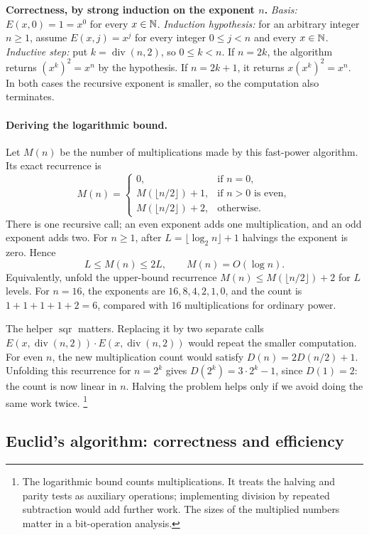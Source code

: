 \textbf{Correctness, by strong induction on the exponent $n$.}
\emph{Basis:} $E(x,0)=1=x^0$ for every $x\in\mathbb{N}$.
\emph{Induction hypothesis:} for an arbitrary integer $n\geq1$, assume
$E(x,j)=x^j$ for every integer $0\leq j<n$ and every $x\in\mathbb{N}$.
\emph{Inductive step:} put $k=\operatorname{div}(n,2)$, so $0\leq k<n$.
If $n=2k$, the algorithm returns $(x^k)^2=x^n$ by the hypothesis.
If $n=2k+1$, it returns $x(x^k)^2=x^n$. In both cases the recursive
exponent is smaller, so the computation also terminates.

\paragraph{Deriving the logarithmic bound.}
Let $M(n)$ be the number of multiplications made by this fast-power algorithm.
Its exact recurrence is
\[
M(n)=\begin{cases}
0,&\text{if }n=0,\\
M(\lfloor n/2\rfloor)+1,&\text{if }n>0\text{ is even},\\
M(\lfloor n/2\rfloor)+2,&\text{otherwise}.
\end{cases}
\]
There is one recursive call; an even exponent adds one multiplication,
and an odd exponent adds two. For $n\geq1$, after
$L=\lfloor\log_2 n\rfloor+1$ halvings the exponent is zero. Hence
\[
L\leq M(n)\leq2L,
\qquad M(n)=O(\log{n}).
\]
Equivalently, unfold the upper-bound recurrence
$M(n)\leq M(\lfloor n/2\rfloor)+2$ for $L$ levels.
For $n=16$, the exponents are $16,8,4,2,1,0$, and the count is
$1+1+1+1+2=6$, compared with $16$ multiplications for ordinary power.

The helper $\operatorname{sqr}$ matters. Replacing it by two separate calls
$E(x,\operatorname{div}(n,2))\cdot E(x,\operatorname{div}(n,2))$ would repeat
the smaller computation. For even $n$, the new multiplication count would
satisfy $D(n)=2D(n/2)+1$. Unfolding this recurrence for $n=2^k$ gives
$D(2^k)=3\cdot2^k-1$, since $D(1)=2$: the count is now linear in $n$.
Halving the problem helps only if we avoid doing the same work twice.
\footnote{The logarithmic bound counts multiplications. It treats the
halving and parity tests as auxiliary operations; implementing division by
repeated subtraction would add further work. The sizes of the multiplied
numbers matter in a bit-operation analysis.}

\subsection{Euclid's algorithm: correctness and efficiency}
\label{sec:alg-euclid}

